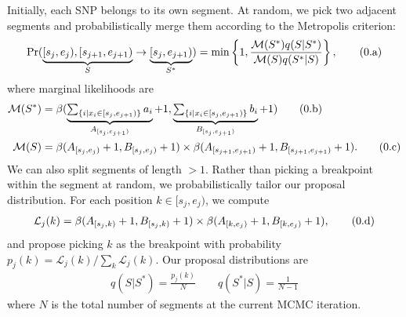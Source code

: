 \documentclass[10pt,letter]{article}
\numberwithin{equation}{section}
\newcommand{\rt}{\right}
\newcommand{\lt}{\left}
\newcommand{\btag}[1]{\addtocounter{equation}{1}\label{#1}\tag{\arabic{section}.\alph{equation}}}
\newcommand{\textop}[1]{\operatorname{#1}}
\begin{document}
Initially, each SNP belongs to its own segment. At random, we pick two adjacent segments and probabilistically merge them according to the Metropolis criterion:
\begin{align*}
\textop{Pr}(\underbrace{[s_j,e_j),[s_{j+1},e_{j+1})}_{S}\to \underbrace{[s_j,e_{j+1})}_{S^\ast}) = \min\lt\{1,\frac{\mathcal{M}(S^\ast)q(S|S^\ast)}{\mathcal{M}(S)q(S^\ast|S)}\rt\},\btag{metro}
\end{align*}
where marginal likelihoods are
\begin{align*}
\mathcal{M}(S^\ast) &= \beta(\underbrace{\textstyle\sum_{\{i|x_i\in [s_j, e_{j+1})\}}a_i}_{A_{[s_j,e_{j+1})}}+1,\underbrace{\textstyle\sum_{\{i|x_i\in [s_j, e_{j+1})\}}b_i}_{B_{[s_j,e_{j+1})}}+1)\btag{psum_1}\\
\mathcal{M}(S) &= \beta(A_{[s_j,e_j)}+1,B_{[s_j,e_j)}+1)\times \beta(A_{[s_{j+1},e_{j+1})}+1,B_{[s_{j+1},e_{j+1})}+1).\btag{psum_2}
\end{align*}
We can also split segments of length $>1$. Rather than picking a breakpoint within the segment at random, we probabilistically tailor our proposal distribution. For each position $k\in [s_j,e_j)$, we compute
\begin{align*}
\mathcal{L}_j(k) = \beta(A_{[s_j,k)}+1,B_{[s_j,k)}+1)\times\beta(A_{[k,e_j)}+1,B_{[k,e_j)}+1),\btag{psum_3}
\end{align*}
and propose picking $k$ as the breakpoint with probability $p_j(k)=\mathcal{L}_j(k)/\sum_k \mathcal{L}_j(k)$. Our proposal distributions are
\begin{align*}
q(S|S^\ast) = \frac{p_j(k)}{N} \qquad q(S^\ast|S) = \frac{1}{N-1}
\end{align*}
where $N$ is the total number of segments at the current MCMC iteration.
\end{document}
